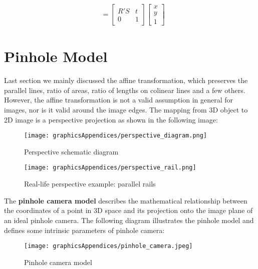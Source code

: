 \begin{tcolorbox}
\begin{align*}
    &= \left[\begin{array}{cc} R'S & t \\ 0 & 1 \end{array}\right] \left[\begin{array}{r}x\\ y\\ 1 \end{array}\right] 
\end{align*}
\end{tcolorbox}

\section{Pinhole Model}
Last section we mainly discussed the affine transformation, which preserves the parallel lines, ratio of areas, ratio of lengths on colinear lines and a few others. However, the affine transformation is not a valid assumption in general for images, nor is it valid around the image edges. The mapping from 3D object to 2D image is a perspective projection as shown in the following image:

\begin{figure}[H]
\centering
\begin{minipage}{.4\textwidth}
  \centering
\texttt{[image: graphicsAppendices/perspective\_diagram.png]}
  \label{fig:perspectiveDiagram}
  \caption{Perspective schematic diagram}
\end{minipage}%
\hspace*{1cm}
\begin{minipage}{.4\textwidth}
  \centering
 \texttt{[image: graphicsAppendices/perspective\_rail.png]}
 \caption{Real-life perspective example: parallel rails}
  \label{fig:perspectiveRail}
\end{minipage}
\label{fig:real-lifeExample}
\end{figure}
The \textbf{pinhole camera model} describes the mathematical relationship between the coordinates of a point in 3D space and its projection onto the image plane of an ideal pinhole camera. The following diagram illustrates the pinhole model and defines some intrinsic parameters of pinhole camera:
\begin{figure}[H]
\centering
\texttt{[image: graphicsAppendices/pinhole\_camera.jpeg]}
\caption{Pinhole camera model}
\label{fig:pinholeCameraModel}
\end{figure}

